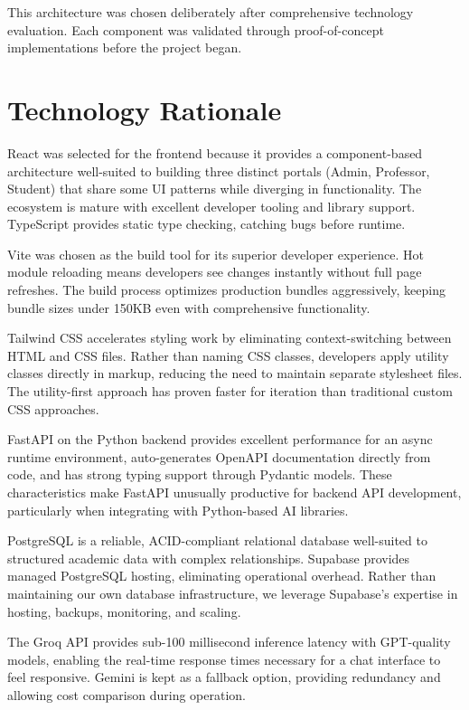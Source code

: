 \documentclass[12pt,a4paper]{report}
\begin{document}
This architecture was chosen deliberately after comprehensive technology evaluation. Each component was validated through proof-of-concept implementations before the project began.

\section{Technology Rationale}

React was selected for the frontend because it provides a component-based architecture well-suited to building three distinct portals (Admin, Professor, Student) that share some UI patterns while diverging in functionality. The ecosystem is mature with excellent developer tooling and library support. TypeScript provides static type checking, catching bugs before runtime.

Vite was chosen as the build tool for its superior developer experience. Hot module reloading means developers see changes instantly without full page refreshes. The build process optimizes production bundles aggressively, keeping bundle sizes under 150KB even with comprehensive functionality.

Tailwind CSS accelerates styling work by eliminating context-switching between HTML and CSS files. Rather than naming CSS classes, developers apply utility classes directly in markup, reducing the need to maintain separate stylesheet files. The utility-first approach has proven faster for iteration than traditional custom CSS approaches.

FastAPI on the Python backend provides excellent performance for an async runtime environment, auto-generates OpenAPI documentation directly from code, and has strong typing support through Pydantic models. These characteristics make FastAPI unusually productive for backend API development, particularly when integrating with Python-based AI libraries.

PostgreSQL is a reliable, ACID-compliant relational database well-suited to structured academic data with complex relationships. Supabase provides managed PostgreSQL hosting, eliminating operational overhead. Rather than maintaining our own database infrastructure, we leverage Supabase's expertise in hosting, backups, monitoring, and scaling.

The Groq API provides sub-100 millisecond inference latency with GPT-quality models, enabling the real-time response times necessary for a chat interface to feel responsive. Gemini is kept as a fallback option, providing redundancy and allowing cost comparison during operation.
\end{document}
